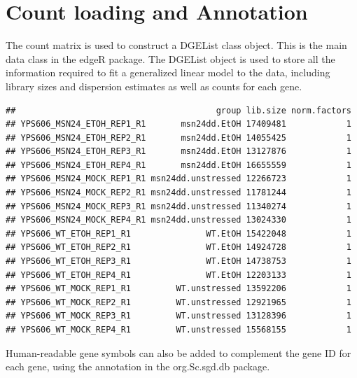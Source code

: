 \documentclass[
]{book}
\newenvironment{Shaded}{\begin{snugshade}}{\end{snugshade}}
\newcommand{\AttributeTok}[1]{\textcolor[rgb]{0.13,0.29,0.53}{#1}}
\newcommand{\FunctionTok}[1]{\textcolor[rgb]{0.13,0.29,0.53}{\textbf{#1}}}
\newcommand{\NormalTok}[1]{#1}
\newcommand{\OtherTok}[1]{\textcolor[rgb]{0.56,0.35,0.01}{#1}}
\newcommand{\SpecialCharTok}[1]{\textcolor[rgb]{0.81,0.36,0.00}{\textbf{#1}}}
\begin{document}
\hypertarget{count-loading-and-annotation}{%
\section{Count loading and Annotation}\label{count-loading-and-annotation}}

The count matrix is used to construct a DGEList class object. This is
the main data class in the edgeR package. The DGEList object is used to
store all the information required to fit a generalized linear model to
the data, including library sizes and dispersion estimates as well as
counts for each gene.

\begin{Shaded}
\end{Shaded}

\begin{verbatim}
##                                        group lib.size norm.factors
## YPS606_MSN24_ETOH_REP1_R1       msn24dd.EtOH 17409481            1
## YPS606_MSN24_ETOH_REP2_R1       msn24dd.EtOH 14055425            1
## YPS606_MSN24_ETOH_REP3_R1       msn24dd.EtOH 13127876            1
## YPS606_MSN24_ETOH_REP4_R1       msn24dd.EtOH 16655559            1
## YPS606_MSN24_MOCK_REP1_R1 msn24dd.unstressed 12266723            1
## YPS606_MSN24_MOCK_REP2_R1 msn24dd.unstressed 11781244            1
## YPS606_MSN24_MOCK_REP3_R1 msn24dd.unstressed 11340274            1
## YPS606_MSN24_MOCK_REP4_R1 msn24dd.unstressed 13024330            1
## YPS606_WT_ETOH_REP1_R1               WT.EtOH 15422048            1
## YPS606_WT_ETOH_REP2_R1               WT.EtOH 14924728            1
## YPS606_WT_ETOH_REP3_R1               WT.EtOH 14738753            1
## YPS606_WT_ETOH_REP4_R1               WT.EtOH 12203133            1
## YPS606_WT_MOCK_REP1_R1         WT.unstressed 13592206            1
## YPS606_WT_MOCK_REP2_R1         WT.unstressed 12921965            1
## YPS606_WT_MOCK_REP3_R1         WT.unstressed 13128396            1
## YPS606_WT_MOCK_REP4_R1         WT.unstressed 15568155            1
\end{verbatim}

Human-readable gene symbols can also be added to complement the gene ID
for each gene, using the annotation in the org.Sc.sgd.db package.
\end{document}
